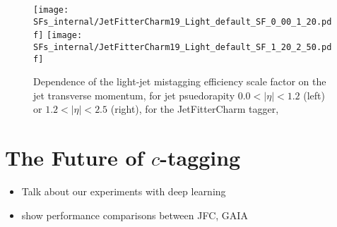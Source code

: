 \begin{figure}[!htb]
  \centering
  \texttt{[image: SFs\_internal/JetFitterCharm19\_Light\_default\_SF\_0\_00\_1\_20.pdf]}
  \texttt{[image: SFs\_internal/JetFitterCharm19\_Light\_default\_SF\_1\_20\_2\_50.pdf]}
  \caption{Dependence of the light-jet mistagging efficiency scale factor on the jet transverse momentum, for jet psuedorapity $0.0 < | \eta | < 1.2$ (left) or $1.2 < | \eta | < 2.5$ (right), for the JetFitterCharm tagger, \lSF}
  
  \label{tag:JFC_SF_L1}
\end{figure}




\section{The Future of $c$-tagging}
\begin{itemize}
\item Talk about our experiments with deep learning
\item  show performance comparisons between JFC, GAIA
\end{itemize}
